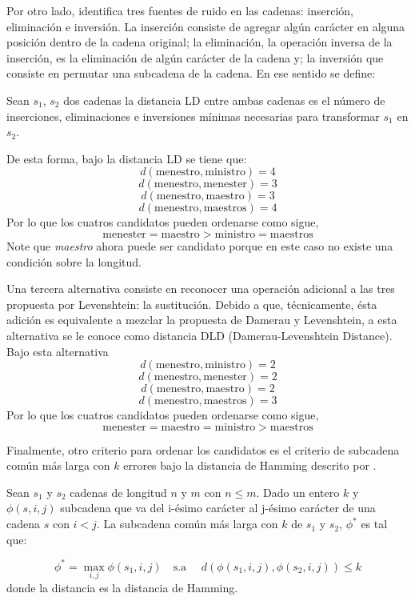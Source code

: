 Por otro lado, \cite{levenshtein1966binary} identifica tres fuentes de ruido en las cadenas: inserción, eliminación e inversión. La inserción consiste de agregar algún carácter en alguna posición dentro de la cadena original; la eliminación, la operación inversa de la inserción, es la eliminación de algún carácter de la cadena y; la inversión que consiste en permutar una subcadena de la cadena. En ese sentido se define:
\begin{defi}[Distancia LD]
	Sean $s_1$, $s_2$ dos cadenas la distancia LD entre ambas cadenas es el número de inserciones, eliminaciones e inversiones mínimas necesarias para transformar $s_1$ en $s_2$.
\end{defi}
De esta forma, bajo la distancia LD se tiene que:
$$d(\mbox{menestro},\mbox{ministro}) = 4$$ $$d(\mbox{menestro},\mbox{menester}) = 3$$ $$d(\mbox{menestro},\mbox{maestro}) = 3$$ $$d(\mbox{menestro},\mbox{maestros}) = 4$$
Por lo que los cuatros candidatos pueden ordenarse como sigue, $$\mbox{menester} = \mbox{maestro} > \mbox{ministro} = \mbox{maestros}$$
Note que \textit{maestro} ahora puede ser candidato porque en este caso no existe una condición sobre la longitud.

Una tercera alternativa consiste en reconocer una operación adicional a las tres propuesta por Levenshtein: la sustitución. Debido a que, técnicamente, ésta adición es equivalente a mezclar la propuesta de Damerau y Levenshtein, a esta alternativa se le conoce como distancia DLD (Damerau-Levenshtein Distance). Bajo esta alternativa
$$d(\mbox{menestro},\mbox{ministro}) = 2$$ $$d(\mbox{menestro},\mbox{menester}) = 2$$ $$d(\mbox{menestro},\mbox{maestro}) = 2$$ $$d(\mbox{menestro},\mbox{maestros}) = 3$$
Por lo que los cuatros candidatos pueden ordenarse como sigue, $$\mbox{menester} = \mbox{maestro} = \mbox{ministro} > \mbox{maestros}$$

Finalmente, otro criterio para ordenar los candidatos es el criterio de subcadena común más larga con $k$ errores bajo la distancia de Hamming descrito por \cite{flouri2015longest}.

\begin{defi}
	Sean $s_1$ y $s_2$ cadenas de longitud $n$ y $m$ con $n \leq m$. Dado un entero $k$ y $\phi(s,i,j)$ subcadena que va del i-ésimo carácter al j-ésimo carácter de una cadena $s$ con $i < j$. La subcadena común más larga con $k$ de $s_1$ y $s_2$, $\phi^{*}$ es tal que:
	
	$$\phi^{*} = \max_{i,j} \phi(s_1,i,j) \quad \mbox{s.a }\quad d(\phi(s_1,i,j),\phi(s_2,i,j))\leq k$$
	donde la distancia es la distancia de Hamming.
\end{defi}

